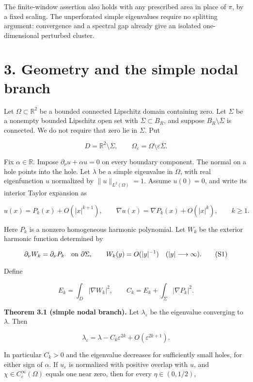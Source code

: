 \documentclass[11pt]{article}
\begin{document}
The finite-window assertion also holds with any prescribed area in place
of \(\pi\), by a fixed scaling. The unperforated simple eigenvalues
require no splitting argument: convergence and a spectral gap already
give an isolated one-dimensional perturbed cluster.

\section{3. Geometry and the simple nodal
branch}\label{geometry-and-the-simple-nodal-branch}

Let \(\Omega\subset\mathbb R^2\) be a bounded connected Lipschitz domain
containing zero. Let \(\Sigma\) be a nonempty bounded Lipschitz open set
with \(\overline\Sigma\subset B_R\), and suppose
\(B_R\setminus\overline\Sigma\) is connected. We do not require that
zero lie in \(\Sigma\). Put

\[
 D=\mathbb R^2\setminus\overline\Sigma,
 \qquad \Omega_\varepsilon=\Omega\setminus\varepsilon\overline\Sigma.
\]

Fix \(\alpha\in\mathbb R\). Impose \(\partial_\nu u+\alpha u=0\) on
every boundary component. The normal on a hole points into the hole. Let
\(\lambda\) be a simple eigenvalue in \(\Omega\), with real
eigenfunction \(u\) normalized by \(\|u\|_{L^2(\Omega)}=1\). Assume
\(u(0)=0\), and write its interior Taylor expansion as

\[
 u(x)=P_k(x)+O(|x|^{k+1}),\qquad
 \nabla u(x)=\nabla P_k(x)+O(|x|^k),\qquad k\ge1.
\]

Here \(P_k\) is a nonzero homogeneous harmonic polynomial. Let \(W_k\)
be the exterior harmonic function determined by

\[
 \partial_\nu W_k=\partial_\nu P_k\quad\hbox{on }\partial\Sigma,
 \qquad W_k(y)=O(|y|^{-1})\quad (|y|\longrightarrow\infty).
 \tag{S1}
\]

Define

\[
 E_k=\int_D|\nabla W_k|^2,
 \qquad C_k=E_k+\int_\Sigma|\nabla P_k|^2.
 \tag{S2}
\]

\textbf{Theorem 3.1 (simple nodal branch).} Let \(\lambda_\varepsilon\)
be the eigenvalue converging to \(\lambda\). Then

\[
 \lambda_\varepsilon
 =\lambda-C_k\varepsilon^{2k}
   +O(\varepsilon^{2k+1}).
 \tag{S3}
\]

In particular \(C_k>0\) and the eigenvalue decreases for sufficiently
small holes, for either sign of \(\alpha\). If \(u_\varepsilon\) is
normalized with positive overlap with \(u\), and
\(\chi\in C_c^\infty(\Omega)\) equals one near zero, then for every
\(\eta\in(0,1/2)\),
\end{document}
